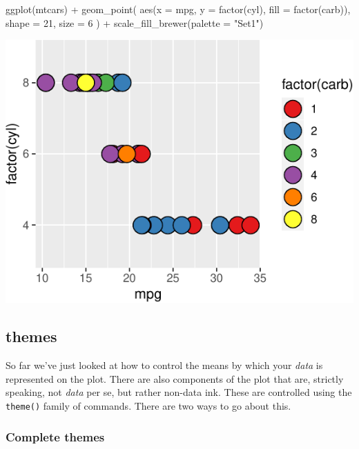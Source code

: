 \documentclass[
]{krantz}
\newenvironment{Shaded}{\begin{snugshade}}{\end{snugshade}}
\newcommand{\AttributeTok}[1]{\textcolor[rgb]{0.77,0.63,0.00}{#1}}
\newcommand{\DecValTok}[1]{\textcolor[rgb]{0.00,0.00,0.81}{#1}}
\newcommand{\FunctionTok}[1]{\textcolor[rgb]{0.00,0.00,0.00}{#1}}
\newcommand{\NormalTok}[1]{#1}
\newcommand{\SpecialCharTok}[1]{\textcolor[rgb]{0.00,0.00,0.00}{#1}}
\newcommand{\StringTok}[1]{\textcolor[rgb]{0.31,0.60,0.02}{#1}}
\begin{document}
\begin{Shaded}
\begin{Highlighting}[]
\FunctionTok{ggplot}\NormalTok{(mtcars) }\SpecialCharTok{+}
  \FunctionTok{geom\_point}\NormalTok{(}
    \FunctionTok{aes}\NormalTok{(}\AttributeTok{x =}\NormalTok{ mpg, }\AttributeTok{y =} \FunctionTok{factor}\NormalTok{(cyl), }\AttributeTok{fill =} \FunctionTok{factor}\NormalTok{(carb)), }
    \AttributeTok{shape =} \DecValTok{21}\NormalTok{, }\AttributeTok{size =} \DecValTok{6}
\NormalTok{  ) }\SpecialCharTok{+}
  \FunctionTok{scale\_fill\_brewer}\NormalTok{(}\AttributeTok{palette =} \StringTok{"Set1"}\NormalTok{)}
\end{Highlighting}
\end{Shaded}

\begin{center}\includegraphics[width=0.8\linewidth]{index_files/figure-latex/unnamed-chunk-62-1} \end{center}

\hypertarget{themes}{%
\subsection{themes}\label{themes}}

So far we've just looked at how to control the means by which your \emph{data} is represented on the plot. There are also components of the plot that are, strictly speaking, not \emph{data} per se, but rather non-data ink. These are controlled using the \texttt{theme()} family of commands. There are two ways to go about this.

\hypertarget{complete-themes}{%
\subsubsection{Complete themes}\label{complete-themes}}
\end{document}
